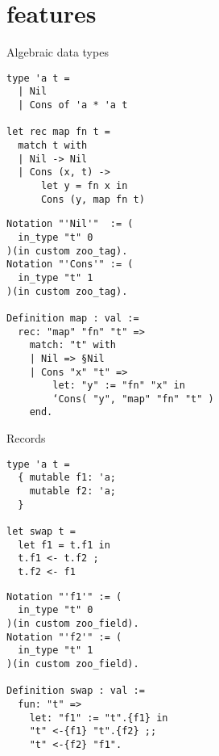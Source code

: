 \section{\Zoo features}

\begin{frame}[fragile]{Algebraic data types}
\begin{minipage}{0.49\textwidth}
  \begin{verbatim}
type 'a t =
  | Nil
  | Cons of 'a * 'a t

let rec map fn t =
  match t with
  | Nil -> Nil
  | Cons (x, t) ->
      let y = fn x in
      Cons (y, map fn t)
  \end{verbatim}
\end{minipage}
\begin{minipage}{0.5\textwidth}
  \begin{verbatim}
Notation "'Nil'"  := (
  in_type "t" 0
)(in custom zoo_tag).
Notation "'Cons'" := (
  in_type "t" 1
)(in custom zoo_tag).

Definition map : val :=
  rec: "map" "fn" "t" =>
    match: "t" with
    | Nil => §Nil
    | Cons "x" "t" =>
        let: "y" := "fn" "x" in
        ‘Cons( "y", "map" "fn" "t" )
    end.
  \end{verbatim}
\end{minipage}
\end{frame}

\begin{frame}[fragile]{Records}
\begin{minipage}{0.49\textwidth}
  \begin{verbatim}
type 'a t =
  { mutable f1: 'a;
    mutable f2: 'a;
  }

let swap t =
  let f1 = t.f1 in
  t.f1 <- t.f2 ;
  t.f2 <- f1
  \end{verbatim}
\end{minipage}
\begin{minipage}{0.5\textwidth}
  \begin{verbatim}
Notation "'f1'" := (
  in_type "t" 0
)(in custom zoo_field).
Notation "'f2'" := (
  in_type "t" 1
)(in custom zoo_field).

Definition swap : val :=
  fun: "t" =>
    let: "f1" := "t".{f1} in
    "t" <-{f1} "t".{f2} ;;
    "t" <-{f2} "f1".
  \end{verbatim}
\end{minipage}
\end{frame}

